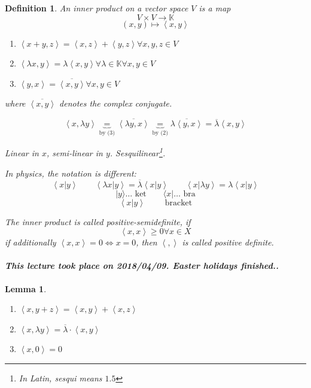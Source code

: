 \documentclass{article}
\newtheorem{definition}{Definition}  \numberwithin{definition}{section}
\newtheorem{lemma}{Lemma}  \numberwithin{lemma}{section}
\newcommand{\angel}[1]{\left\langle#1\right\rangle}
\newcommand{\dateref}[1]{\paragraph{\textit{This lecture took place on #1.}}}
\begin{document}
\begin{definition} %
  An inner product on a vector space $V$ is a map
  \[ V \times V \to \mathbb K \]
  \[ (x,y) \mapsto \angel{x,y} \]
  \begin{enumerate}
    \item $\angel{x+y, z} = \angel{x,z} + \angel{y,z} \forall x,y,z \in V$
    \item $\angel{\lambda x, y} = \lambda \angel{x,y} \forall \lambda \in \mathbb K \forall x,y \in V$
    \item $\angel{y,x} = \overline{\angel{x,y}} \forall x,y \in V$
  \end{enumerate}
  where $\overline{\angel{x,y}}$ denotes the complex conjugate.

  \[
    \angel{x, \lambda y} \underbrace{=}_{\text{by (3)}} \overline{\angel{\lambda y, x}}
      \underbrace{=}_{\text{by (2)}} \overline{\lambda \angel{y, x}}
      = \overline{\lambda} \angel{x,y}
  \]

  Linear in $x$, semi-linear in $y$. Sesquilinear\footnote{In Latin, sesqui means $1.5$}.

  In physics, the notation is different:
  \[ \angel{x|y} \qquad \angel{\lambda x|y} = \overline{\lambda} \angel{x|y} \qquad \angel{x|\lambda y} = \lambda \angel{x|y} \]
  \[ |y\rangle \dots \text{ ket} \qquad \langle x| \dots \text{ bra} \]
  \[ \angel{x|y} \qquad \text{ bracket} \]

  The inner product is called positive-semidefinite, if
  \[ \angel{x,x} \geq 0 \forall x \in X \]
  if additionally $\angel{x,x} = 0 \iff x = 0$, then $\angel{,}$ is called positive definite.
\end{definition}

\dateref{2018/04/09. Easter holidays finished.}

\begin{lemma} %
  \begin{enumerate}
    \item $\angel{x, y + z} = \angel{x, y} + \angel{x, z}$
    \item $\angel{x, \lambda y} = \overline{\lambda} \cdot \angel{x, y}$
    \item $\angel{x, 0} = 0$
  \end{enumerate}
\end{lemma}
\end{document}
